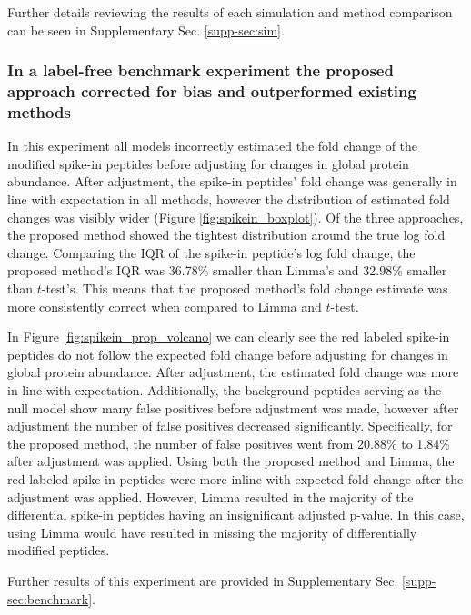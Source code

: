 \documentclass[mcp]{article}
\numberwithin{table}{section}
\begin{document}
Further details reviewing the results of each simulation and  method comparison can be seen in Supplementary Sec. \ref{supp-sec:sim}. 

\subsubsection*{In a label-free benchmark experiment the proposed approach corrected for bias and outperformed existing methods}

In this experiment all models incorrectly estimated the fold change of the modified spike-in peptides before adjusting for changes in global protein abundance. After adjustment, the spike-in peptides' fold change was generally in line with expectation in all methods, however the distribution of estimated fold changes was visibly wider (Figure \ref{fig:spikein_boxplot}). Of the three approaches, the proposed method showed the tightest distribution around the true log fold change. Comparing the IQR of the spike-in peptide's log fold change, the proposed method's IQR was 36.78\% smaller than Limma's and 32.98\% smaller than $t$-test's. This means that the proposed method's fold change estimate was more consistently correct when compared to Limma and $t$-test.

In Figure \ref{fig:spikein_prop_volcano} we can clearly see the red labeled spike-in peptides do not follow the expected fold change before adjusting for changes in global protein abundance. After adjustment, the estimated fold change was more in line with expectation. Additionally, the background peptides serving as the null model show many false positives before adjustment was made, however after adjustment the number of false positives decreased significantly. Specifically, for the proposed method, the number of false positives went from 20.88\% to 1.84\% after adjustment was applied. Using both the proposed method and Limma, the red labeled spike-in peptides were more inline with expected fold change after the adjustment was applied. However, Limma resulted in the majority of the differential spike-in peptides having an insignificant adjusted p-value. In this case, using Limma would have resulted in missing the majority of differentially modified peptides.

Further results of this experiment are provided in Supplementary Sec. \ref{supp-sec:benchmark}. 

\end{document}
